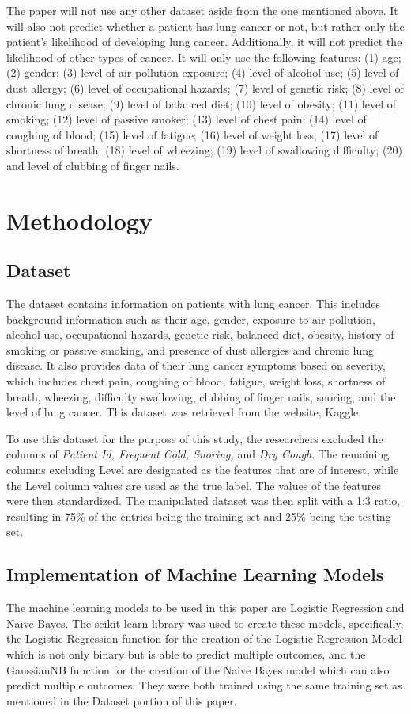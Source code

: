 \documentclass[runningheads]{llncs}
\begin{document}
The paper will not use any other dataset aside from the one mentioned above. It will also not predict whether a patient has lung cancer or not, but rather only the patient’s likelihood of developing lung cancer. Additionally, it will not predict the likelihood of other types of cancer. It will only use the following features: (1) age; (2) gender; (3) level of air pollution exposure; (4) level of alcohol use; (5) level of dust allergy; (6) level of occupational hazards; (7) level of genetic risk; (8) level of chronic lung disease; (9) level of balanced diet; (10) level of obesity; (11) level of smoking; (12) level of passive smoker; (13) level of chest pain; (14) level of coughing of blood; (15) level of fatigue; (16) level of weight loss; (17) level of shortness of breath; (18) level of wheezing; (19) level of swallowing difficulty; (20) and level of clubbing of finger nails.

\section{Methodology}

\subsection{Dataset}
The dataset contains information on patients with lung cancer. This includes background information such as their age, gender, exposure to air pollution, alcohol use, occupational hazards, genetic risk, balanced diet, obesity, history of smoking or passive smoking, and presence of dust allergies and chronic lung disease. It also provides data of their lung cancer symptoms based on severity, which includes chest pain, coughing of blood, fatigue, weight loss, shortness of breath, wheezing, difficulty swallowing, clubbing of finger nails, snoring, and the level of lung cancer. This dataset was retrieved from the website, Kaggle.

To use this dataset for the purpose of this study, the researchers excluded the columns of \textit{Patient Id, Frequent Cold, Snoring,} and \textit{Dry Cough}. The remaining columns excluding Level are designated as the features that are of interest, while the Level column values are used as the true label. The values of the features were then standardized. The manipulated dataset was then split with a 1:3 ratio, resulting in 75\% of the entries being the training set and 25\% being the testing set. 

\subsection{Implementation of Machine Learning Models}
The machine learning models to be used in this paper are Logistic Regression and Naive Bayes. The scikit-learn library was used to create these models, specifically, the Logistic Regression function for the creation of the Logistic Regression Model which is not only binary but is able to predict multiple outcomes, and the GaussianNB function for the creation of the Naive Bayes model which can also predict multiple outcomes. They were both trained using the same training set as mentioned in the Dataset portion of this paper.
\end{document}
